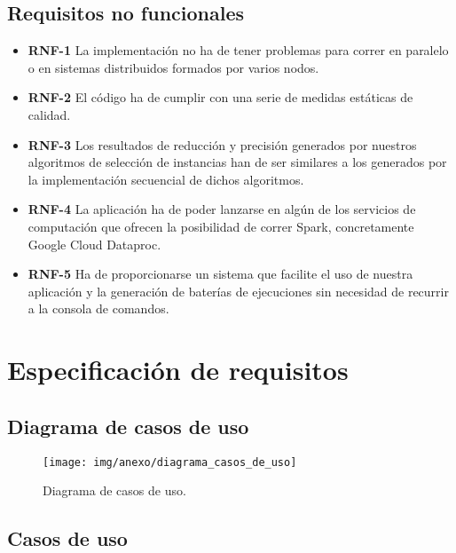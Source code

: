 \subsection{Requisitos no funcionales}

\begin{itemize}

\item \textbf{RNF-1} La implementación no ha de tener problemas para correr en paralelo o en sistemas distribuidos formados por varios nodos.

\item \textbf{RNF-2} El código ha de cumplir con una serie de medidas estáticas de calidad.

\item \textbf{RNF-3} Los resultados de reducción y precisión generados por nuestros algoritmos de selección de instancias han de ser similares a los generados por la implementación secuencial de dichos algoritmos.

\item \textbf{RNF-4} La aplicación ha de poder lanzarse en algún de los servicios de computación que ofrecen la posibilidad de correr Spark, concretamente Google Cloud Dataproc.

\item \textbf{RNF-5} Ha de proporcionarse un sistema que facilite el uso de nuestra aplicación y la generación de baterías de ejecuciones sin necesidad de recurrir a la consola de comandos.

\end{itemize}

\section{Especificación de requisitos}

\subsection{Diagrama de casos de uso}

	\begin{figure}[!h]
		\centering
		\texttt{[image: img/anexo/diagrama\_casos\_de\_uso]}
		\caption{Diagrama de casos de uso.}\label{fig:img/anexo/diagrama_casos_de_uso}
	\end{figure}


 
\subsection{Casos de uso}
 

